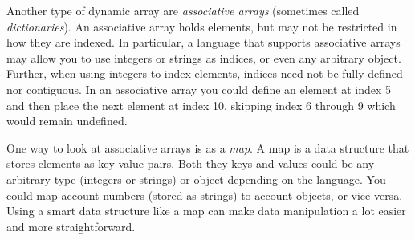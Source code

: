 Another type of dynamic array are \emph{associative arrays} (sometimes
called \emph{dictionaries}).  An associative array
holds elements, but may not be restricted in how they are indexed.
In particular, a language that supports associative arrays may allow 
you to use integers or strings as indices, or even any arbitrary object.
Further, when using integers to index elements, indices need not
be fully defined nor contiguous.  In an associative array you could
define an element at index 5 and then place the next element at index
10, skipping index 6 through 9 which would remain undefined.

One way to look at associative arrays is as a \emph{map}.  A map
is a data structure that stores elements as key-value pairs.  Both 
they keys and values could be any arbitrary type (integers or strings)
or object depending on the language.  You could map account
numbers (stored as strings) to account objects, or vice versa.  Using
a smart data structure like a map can make data manipulation a
lot easier and more straightforward.





